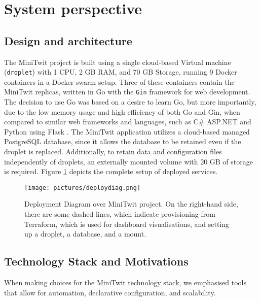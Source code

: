 \section{System perspective} \label{sp}
\subsection{Design and architecture} %
The MiniTwit project is built using a single cloud-based  Virtual machine (\texttt{droplet}) with 1 CPU, 2 GB RAM, and 70 GB Storage, running 9 Docker containers in a Docker swarm setup. Three of these containers contain the MiniTwit replicas, written in Go with the \texttt{Gin} framework for web development. The decision to use Go was based on a desire to learn Go, but more importantly, due to the low memory usage and high efficiency of both Go and Gin, when compared to similar web frameworks and languages, such as C\# ASP.NET and Python using Flask \parencite{benchmark}. The MiniTwit application utilizes a cloud-based managed PostgreSQL database, since it allows the database to be retained even if the droplet is replaced. Additionally, to retain data and configuration files independently of droplets, an externally mounted volume with 20 GB of storage is required. Figure \ref{fig:Deployment} depicts the complete setup of deployed services.

\begin{landscape}
\begin{figure}[H]
    \centering
    \texttt{[image: pictures/deploydiag.png]}
    \caption{Deployment Diagram over MiniTwit project. On the right-hand side, there are some dashed lines, which indicate provisioning from Terraform, which is used for dashboard visualisations, and setting up a droplet, a database, and a mount.}
    \label{fig:Deployment}
\end{figure}
\end{landscape}


\subsection{Technology Stack and Motivations}

When making choices for the MiniTwit technology stack, we emphasised tools that allow for automation, declarative configuration, and scalability.

